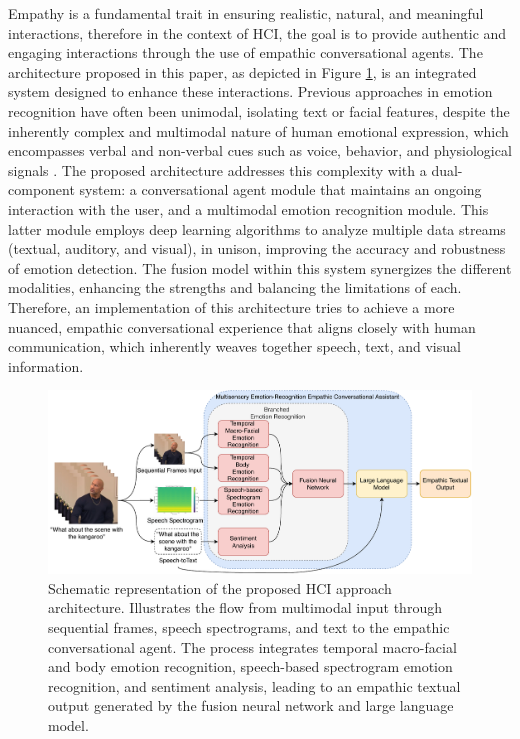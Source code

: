 \documentclass[runningheads]{llncs}
\begin{document}
Empathy is a fundamental trait in ensuring realistic, natural, and meaningful interactions, therefore in the context of HCI, the goal is to provide authentic and engaging interactions through the use of empathic conversational agents. The architecture proposed in this paper, as depicted in Figure \ref{fig:approachArchitecture}, is an integrated system designed to enhance these interactions. Previous approaches in emotion recognition have often been unimodal, isolating text or facial features, despite the inherently complex and multimodal nature of human emotional expression, which encompasses verbal and non-verbal cues such as voice, behavior, and physiological signals \cite{ezzameli_emotion_2023, zhu_multimodal_2023}. The proposed architecture addresses this complexity with a dual-component system: a conversational agent module that maintains an ongoing interaction with the user, and a multimodal emotion recognition module. This latter module employs deep learning algorithms to analyze multiple data streams (textual, auditory, and visual), in unison, improving the accuracy and robustness of emotion detection. The fusion model within this system synergizes the different modalities, enhancing the strengths and balancing the limitations of each. Therefore, an implementation of this architecture tries to achieve a more nuanced, empathic conversational experience that aligns closely with human communication, which inherently weaves together speech, text, and visual information.

\begin{figure}[htb]
	\centering
	\includegraphics[width=0.97\linewidth]{approachArchitecture.pdf}
	\caption{Schematic representation of the proposed HCI approach architecture. Illustrates the flow from multimodal input through sequential frames, speech spectrograms, and text to the empathic conversational agent. The process integrates temporal macro-facial and body emotion recognition, speech-based spectrogram emotion recognition, and sentiment analysis, leading to an empathic textual output generated by the fusion neural network and large language model.}
	\label{fig:approachArchitecture}
\end{figure}
\end{document}

